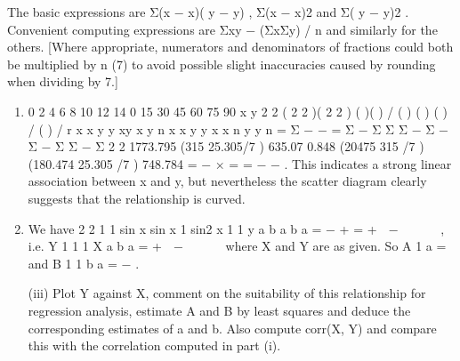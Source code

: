 \documentclass[a4paper,12pt]{article}
\begin{document}
The basic expressions are Σ(x − x)( y − y) , Σ(x − x)2 and Σ( y − y)2 . Convenient
computing expressions are Σxy − (ΣxΣy) / n and similarly for the others. [Where
appropriate, numerators and denominators of fractions could both be multiplied by n
(7) to avoid possible slight inaccuracies caused by rounding when dividing by 7.]
\begin{enumerate}
\item 
0
2
4
6
8
10
12
14
0 15 30 45 60 75 90
x
y
2 2 ( 2 2 )( 2 2 )
( )( ) /
( ) ( ) ( ) / ( ) /
r x x y y xy x y n
x x y y x x n y y n
= Σ − − = Σ − Σ Σ
Σ − Σ − Σ − Σ Σ − Σ
2 2
1773.795 (315 25.305/7 ) 635.07 0.848
(20475 315 /7 )(180.474 25.305 /7 ) 748.784
= − × = =
− −
.
This indicates a strong linear association between x and y, but nevertheless the scatter
diagram clearly suggests that the relationship is curved.
\item 
We have
2 2
1 1 sin x sin x 1 sin2 x 1 1
y a b a b a
= − + = +  −   
 
, i.e. Y 1 1 1 X
a b a
= +  −   
 
where
X and Y are as given.
So A 1
a
= and B 1 1
b a
= − .

\newpage

\begin{framed}
(iii) Plot Y against X, comment on the suitability of this relationship for regression
analysis, estimate A and B by least squares and deduce the corresponding
estimates of a and b. Also compute corr(X, Y) and compare this with the
correlation computed in part (i).


\end{framed}
\end{enumerate}
\end{document}
